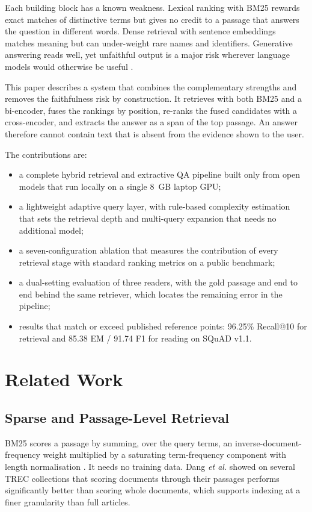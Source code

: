 \documentclass[conference]{IEEEtran}
\begin{document}
Each building block has a known weakness. Lexical ranking with BM25 \cite{robertson2009} rewards
exact matches of distinctive terms but gives no credit to a passage that answers the question in
different words. Dense retrieval with sentence embeddings \cite{reimers2019} matches meaning but
can under-weight rare names and identifiers. Generative answering reads well, yet unfaithful
output is a major risk wherever language models would otherwise be useful \cite{malin2025}.

This paper describes a system that combines the complementary strengths and removes the
faithfulness risk by construction. It retrieves with both BM25 and a bi-encoder, fuses the
rankings by position, re-ranks the fused candidates with a cross-encoder, and extracts the answer
as a span of the top passage. An answer therefore cannot contain text that is absent from the
evidence shown to the user.

The contributions are:
\begin{itemize}
\item a complete hybrid retrieval and extractive QA pipeline built only from open models that
      run locally on a single 8~GB laptop GPU;
\item a lightweight adaptive query layer, with rule-based complexity estimation that sets the
      retrieval depth and multi-query expansion that needs no additional model;
\item a seven-configuration ablation that measures the contribution of every retrieval stage
      with standard ranking metrics on a public benchmark;
\item a dual-setting evaluation of three readers, with the gold passage and end to end behind
      the same retriever, which locates the remaining error in the pipeline;
\item results that match or exceed published reference points: 96.25\% Recall@10 for retrieval
      and 85.38 EM / 91.74 F1 for reading on SQuAD v1.1.
\end{itemize}

\section{Related Work}

\subsection{Sparse and Passage-Level Retrieval}
BM25 scores a passage by summing, over the query terms, an inverse-document-frequency weight
multiplied by a saturating term-frequency component with length normalisation
\cite{robertson2009}. It needs no training data. Dang \emph{et al.} \cite{dang2021} showed on
several TREC collections that scoring documents through their passages performs significantly
better than scoring whole documents, which supports indexing at a finer granularity than full
articles.
\end{document}
